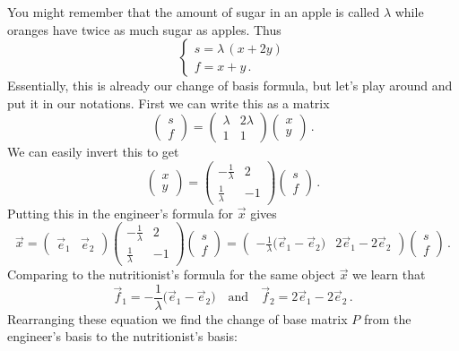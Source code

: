 {You might remember that the amount of sugar in an apple 
is called $\lambda$ while oranges have twice as much sugar as apples.
Thus
\[
\left\{
\begin{array}{l}
s=\lambda\, (x+2y)\\
f=x+y\, .
\end{array}
\right.
\]
Essentially, this is already our change of basis formula, but let's play around and put it in our notations.
First we can write this as a matrix
\[
\begin{pmatrix}s\\f\end{pmatrix}=
\begin{pmatrix}\lambda & 2\lambda \\1 & 1
\end{pmatrix}
\begin{pmatrix}x\\y\end{pmatrix}\, .
\]
We can easily invert this to get
\[
\begin{pmatrix}x\\y\end{pmatrix}
=
\begin{pmatrix}-\frac1\lambda & 2\\ \frac1\lambda & -1
\end{pmatrix}
\begin{pmatrix}s\\f\end{pmatrix}\, .
\]
Putting this in the engineer's formula for $\vec x$ gives
\[
\vec x = 
\begin{pmatrix}\vec e_1 & \vec e_2\end{pmatrix}
\begin{pmatrix}-\frac1\lambda & 2\\ \frac1\lambda & -1
\end{pmatrix}
\begin{pmatrix}s\\f\end{pmatrix}
=
\begin{pmatrix}-\frac1\lambda\big(\vec e_1 - \vec e_2\big) &
2\vec e_1-2\vec e_2\end{pmatrix}
\begin{pmatrix}s\\f\end{pmatrix}\, .
\]
Comparing to the nutritionist's formula for the same object $\vec x$ we learn that
\[
\vec f_1 = -\frac1\lambda\big(\vec e_1 - \vec e_2\big)\quad \mbox{and}\quad
\vec f_2=2\vec e_1-2\vec e_2\, .
\]
Rearranging these equation we find the change of base matrix $P$ from the engineer's basis to the nutritionist's basis:
}
